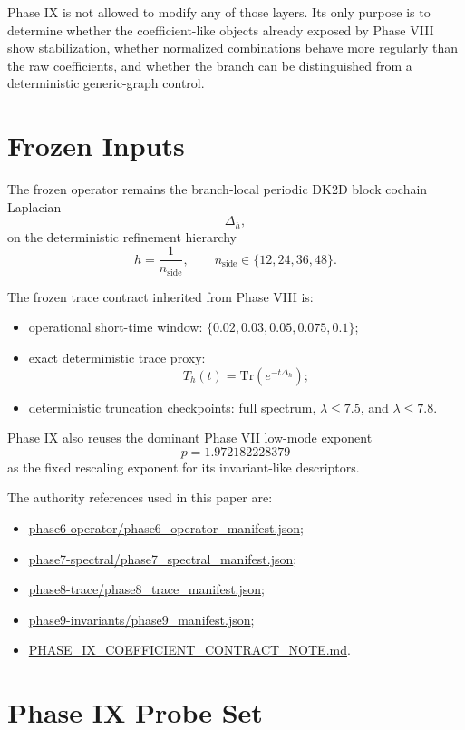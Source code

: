 \documentclass[11pt]{article}
\begin{document}
Phase IX is not allowed to modify any of those layers. Its only purpose is to determine whether the coefficient-like objects already exposed by Phase VIII show stabilization, whether normalized combinations behave more regularly than the raw coefficients, and whether the branch can be distinguished from a deterministic generic-graph control.

\section{Frozen Inputs}

The frozen operator remains the branch-local periodic DK2D block cochain Laplacian
\[
\Delta_h,
\]
on the deterministic refinement hierarchy
\[
h = \frac{1}{n_{\mathrm{side}}}, \qquad n_{\mathrm{side}} \in \{12,24,36,48\}.
\]

The frozen trace contract inherited from Phase VIII is:
\begin{itemize}
\item operational short-time window: $\{0.02, 0.03, 0.05, 0.075, 0.1\}$;
\item exact deterministic trace proxy:
\[
T_h(t) = \mathrm{Tr}\!\left(e^{-t \Delta_h}\right);
\]
\item deterministic truncation checkpoints: full spectrum, $\lambda \le 7.5$, and $\lambda \le 7.8$.
\end{itemize}

Phase IX also reuses the dominant Phase VII low-mode exponent
\[
p = 1.972182228379
\]
as the fixed rescaling exponent for its invariant-like descriptors.

The authority references used in this paper are:
\begin{itemize}
\item \url{phase6-operator/phase6_operator_manifest.json};
\item \url{phase7-spectral/phase7_spectral_manifest.json};
\item \url{phase8-trace/phase8_trace_manifest.json};
\item \url{phase9-invariants/phase9_manifest.json};
\item \url{PHASE_IX_COEFFICIENT_CONTRACT_NOTE.md}.
\end{itemize}

\section{Phase IX Probe Set}
\end{document}
